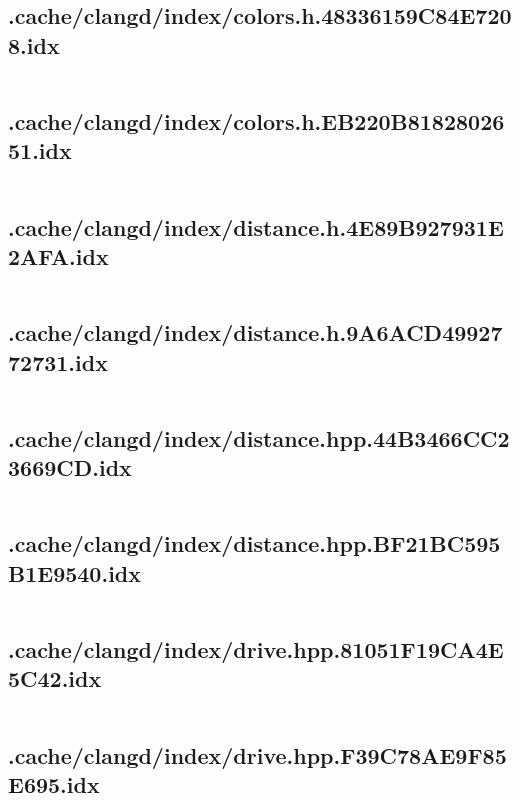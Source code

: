 \subsection{.cache/clangd/index/colors.h.48336159C84E7208.idx}
\inputminted[linenos,tabsize=2,breaklines, breakanywhere]{c}{colors.h.48336159C84E7208.idx}
\pagebreak

\subsection{.cache/clangd/index/colors.h.EB220B8182802651.idx}
\inputminted[linenos,tabsize=2,breaklines, breakanywhere]{c}{colors.h.EB220B8182802651.idx}
\pagebreak

\subsection{.cache/clangd/index/distance.h.4E89B927931E2AFA.idx}
\inputminted[linenos,tabsize=2,breaklines, breakanywhere]{c}{distance.h.4E89B927931E2AFA.idx}
\pagebreak

\subsection{.cache/clangd/index/distance.h.9A6ACD4992772731.idx}
\inputminted[linenos,tabsize=2,breaklines, breakanywhere]{c}{distance.h.9A6ACD4992772731.idx}
\pagebreak

\subsection{.cache/clangd/index/distance.hpp.44B3466CC23669CD.idx}
\inputminted[linenos,tabsize=2,breaklines, breakanywhere]{c}{distance.hpp.44B3466CC23669CD.idx}
\pagebreak

\subsection{.cache/clangd/index/distance.hpp.BF21BC595B1E9540.idx}
\inputminted[linenos,tabsize=2,breaklines, breakanywhere]{c}{distance.hpp.BF21BC595B1E9540.idx}
\pagebreak

\subsection{.cache/clangd/index/drive.hpp.81051F19CA4E5C42.idx}
\inputminted[linenos,tabsize=2,breaklines, breakanywhere]{c}{drive.hpp.81051F19CA4E5C42.idx}
\pagebreak

\subsection{.cache/clangd/index/drive.hpp.F39C78AE9F85E695.idx}
\inputminted[linenos,tabsize=2,breaklines, breakanywhere]{c}{drive.hpp.F39C78AE9F85E695.idx}
\pagebreak

